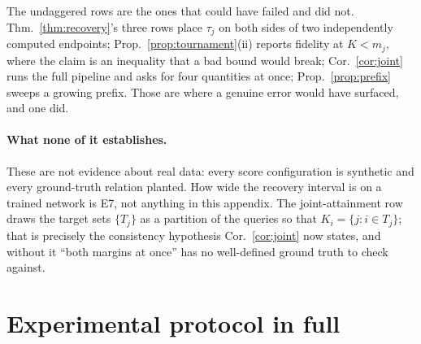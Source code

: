 \documentclass{article}
\begin{document}
The undaggered rows are the ones that could have failed and did not. Thm.~\ref{thm:recovery}'s
three rows place $\tau_j$ on both sides of two independently computed endpoints;
Prop.~\ref{prop:tournament}(ii) reports fidelity at $K<m_j$, where the claim is an inequality
that a bad bound would break; Cor.~\ref{cor:joint} runs the full pipeline and asks for four
quantities at once; Prop.~\ref{prop:prefix} sweeps a growing prefix. Those are where a genuine
error would have surfaced, and one did.

\paragraph{What none of it establishes.} These are not evidence about real data: every score
configuration is synthetic and every ground-truth relation planted. How wide the recovery interval is on a trained network is E7, not
anything in this appendix. The joint-attainment row draws the target sets $\{T_j\}$ as a partition
of the queries so that $K_i=\{j: i\in T_j\}$; that is precisely the consistency hypothesis
Cor.~\ref{cor:joint} now states, and without it ``both margins at once'' has no well-defined
ground truth to check against.

\section{Experimental protocol in full}
\label{app:expprotocol}
\end{document}
